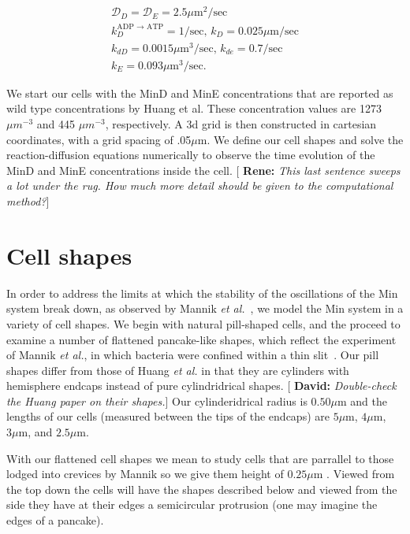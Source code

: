 \documentclass[letterpaper,twocolumn,amsmath,amssymb,pre]{revtex4-1}
\newcommand{\green}[1]{{\bf \color{green} #1}}
\newcommand{\davidsays}[1]{{\color{red} [\green{David:} \emph{#1}]}}
\newcommand{\renesays}[1]{{\color{red} [\green{Rene:} \emph{#1}]}}
\newcommand\micron{\ensuremath{\mu\text{m}}}
\begin{document}
\begin{gather*}
  \mathcal{D}_D = \mathcal{D}_{E} = 2.5\micron^2/\text{sec}\\
  k_D^{\textrm{ADP $\rightarrow$ ATP}} = 1/\textrm{sec,  }
  k_D = 0.025 \micron /\textrm{sec}\\
  k_{dD} = 0.0015 \micron^3/ \textrm{sec,  }
  k_{de} = 0.7/\textrm{sec}\\
  k_E = 0.093 \micron^3 /\textrm{sec}.
\end{gather*}

We start our cells with the MinD and MinE concentrations that are
reported as wild type concentrations by Huang et al. These
concentration values are 1273 $\mu m^{-3}$ and 445 $\mu m^{-3}$,
respectively. A 3d grid is then constructed in cartesian coordinates,
with a grid spacing of .05\micron. We define our cell shapes and solve
the reaction-diffusion equations numerically to observe the time
evolution of the MinD and MinE concentrations inside the
cell. \renesays{This last sentence sweeps a lot under the rug. How
  much more detail should be given to the computational method?}

\section{Cell shapes}

In order to address the limits at which the stability of the
oscillations of the Min system break down, as observed by Mannik
\emph{et al.}~\cite{mannik2012robustness}, we model the Min system in
a variety of cell shapes.  We begin with natural pill-shaped cells,
and the proceed to examine a number of flattened pancake-like shapes,
which reflect the experiment of Mannik \emph{et al.}, in which
bacteria were confined within a thin slit~\cite{mannik2012robustness}.
Our pill shapes differ from those of Huang \emph{et al.} in that they
are cylinders with hemisphere endcaps instead of pure cylindridrical
shapes. \davidsays{Double-check the Huang paper on their shapes.}  Our
cylinderidrical radius is $0.50\micron$ and the lengths of our cells
(measured between the tips of the endcaps) are $5\micron$, $4\micron$, $3\micron$,
and $2.5\micron$.

With our flattened cell shapes we mean to study cells that are
parrallel to those lodged into crevices by Mannik so we give them
height of $0.25\micron$ \cite{mannik2012robustness}.  Viewed from the top
down the cells will have the shapes described below and viewed from
the side they have at their edges a semicircular protrusion (one may
imagine the edges of a pancake).
\end{document}
